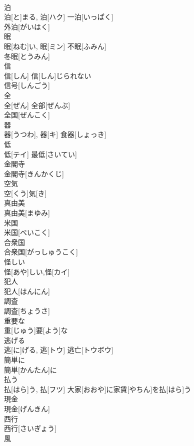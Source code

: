 \documentclass[8pt]{extreport}
\begin{document}
\begin{CJK}{UTF8}{min}
\\	泊	
\\	泊[と]まる, 泊[ハク]	一泊[いっぱく] 
\\	外泊[がいはく] 
\\	眠	
\\	眠[ねむ]い, 眠[ミン]	不眠[ふみん] 
\\	冬眠[とうみん] 
\\	信	
\\	信[しん]	信[しん]じられない 
\\	信号[しんごう] 
\\	全	
\\	全[ぜん]	全部[ぜんぶ] 
\\	全国[ぜんこく] 
\\	器	
\\	器[うつわ], 器[キ]	食器[しょっき] 
\\	低	
\\	低[テイ]	最低[さいてい] 
\\	金閣寺	
\\	金閣寺[きんかくじ]	
\\	空気	
\\	空[くう]気[き]	
\\	真由美	
\\	真由美[まゆみ]	
\\	米国	
\\	米国[べいこく]	
\\	合衆国	
\\	合衆国[がっしゅうこく]	
\\	怪しい	
\\	怪[あや]しい,怪[カイ]	
\\	犯人	
\\	犯人[はんにん]	
\\	調査	
\\	調査[ちょうさ]	
\\	重要な	
\\	重[じゅう]要[よう]な	
\\	逃げる	
\\	逃[に]げる, 逃[トウ]	逃亡[トウボウ] 
\\	簡単に	
\\	簡単[かんたん]に	
\\	払う	
\\	払[はら]う, 払[フツ]	大家[おおや]に家賃[やちん]を払[はら]う 
\\	現金	
\\	現金[げんきん]	
\\	西行	
\\	西行[さいぎょう]	
\\	風	

\end{CJK}
\end{document}
